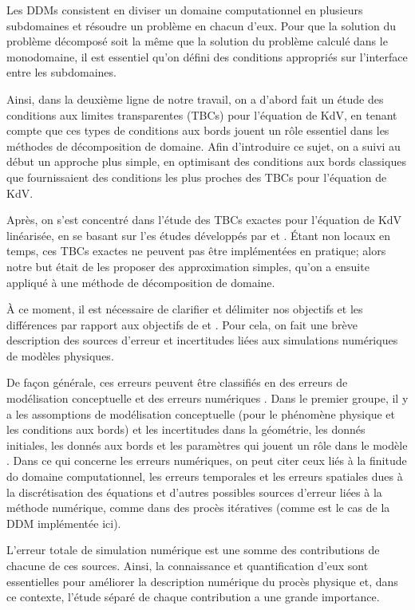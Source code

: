 \indent Les DDMs consistent en diviser un domaine computationnel en plusieurs subdomaines et résoudre un problème en chacun d'eux. Pour que la solution du problème décomposé soit la même que la solution du problème calculé dans le monodomaine, il est essentiel qu'on défini des conditions appropriés sur l'interface entre les subdomaines.

\indent Ainsi, dans la deuxième ligne de notre travail, on a d'abord fait un étude des conditions aux limites transparentes (TBCs) pour l'équation de KdV, en tenant compte que ces types de conditions aux bords jouent un rôle essentiel dans les méthodes de décomposition de domaine. Afin d'introduire ce sujet, on a suivi au début un approche plus simple, en optimisant des conditions aux bords classiques que fournissaient des conditions les plus proches des TBCs pour l'équation de KdV.

\indent Après, on s'est concentré dans l'étude des TBCs exactes pour l'équation de KdV linéarisée, en se basant sur l'es études développés par \cite{zheng2008} et \cite{besse2015}. Étant non locaux en temps, ces TBCs exactes ne peuvent pas être implémentées en pratique; alors notre but était de les proposer des approximation simples, qu'on a ensuite appliqué à une méthode de décomposition de domaine.

\indent À ce moment, il est nécessaire de clarifier et délimiter nos objectifs et les différences par rapport aux objectifs de \cite{zheng2008} et \cite{besse2015}. Pour cela, on fait une brève description des sources d'erreur et incertitudes liées aux simulations numériques de modèles physiques.

\indent De façon générale, ces erreurs peuvent être classifiés en des erreurs de modélisation conceptuelle et des erreurs numériques \cite{roache1997}. Dans le premier groupe, il y a les assomptions de modélisation conceptuelle (pour le phénomène physique et les conditions aux bords) et les incertitudes dans la géométrie, les donnés initiales, les donnés aux bords et les paramètres qui jouent un rôle dans le modèle \cite{roache1997,balagurusamy2008}. Dans ce qui concerne les erreurs numériques, on peut citer ceux liés à la finitude do domaine computationnel, les erreurs temporales et les erreurs spatiales dues à la discrétisation des équations\cite{karniadakis1995,roache1997} et d'autres possibles sources d'erreur liées à la méthode numérique, comme dans des procès itératives (comme est le cas de la DDM implémentée ici).

\indent L'erreur totale de simulation numérique est une somme des contributions de chacune de ces sources. Ainsi, la connaissance et quantification d'eux sont essentielles pour améliorer la description numérique du procès physique et, dans ce contexte, l'étude séparé de chaque contribution a une grande importance.

